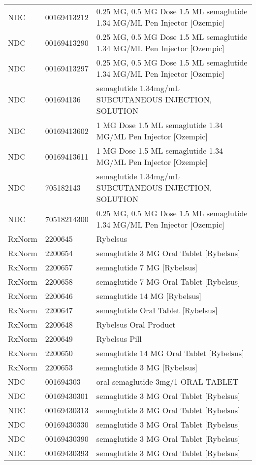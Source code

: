 \begin{longtable}{p{}p{}p{}}
  NDC & 00169413212 & 0.25 MG, 0.5 MG Dose 1.5 ML semaglutide 1.34 MG/ML Pen Injector [Ozempic] \\ 
  NDC & 00169413290 & 0.25 MG, 0.5 MG Dose 1.5 ML semaglutide 1.34 MG/ML Pen Injector [Ozempic] \\ 
  NDC & 00169413297 & 0.25 MG, 0.5 MG Dose 1.5 ML semaglutide 1.34 MG/ML Pen Injector [Ozempic] \\ 
  NDC & 001694136 & semaglutide 1.34mg/mL SUBCUTANEOUS INJECTION, SOLUTION \\ 
  NDC & 00169413602 & 1 MG Dose 1.5 ML semaglutide 1.34 MG/ML Pen Injector [Ozempic] \\ 
  NDC & 00169413611 & 1 MG Dose 1.5 ML semaglutide 1.34 MG/ML Pen Injector [Ozempic] \\ 
  NDC & 705182143 & semaglutide 1.34mg/mL SUBCUTANEOUS INJECTION, SOLUTION \\ 
  NDC & 70518214300 & 0.25 MG, 0.5 MG Dose 1.5 ML semaglutide 1.34 MG/ML Pen Injector [Ozempic] \\ 
  RxNorm & 2200645 & Rybelsus \\ 
  RxNorm & 2200654 & semaglutide 3 MG Oral Tablet [Rybelsus] \\ 
  RxNorm & 2200657 & semaglutide 7 MG [Rybelsus] \\ 
  RxNorm & 2200658 & semaglutide 7 MG Oral Tablet [Rybelsus] \\ 
  RxNorm & 2200646 & semaglutide 14 MG [Rybelsus] \\ 
  RxNorm & 2200647 & semaglutide Oral Tablet [Rybelsus] \\ 
  RxNorm & 2200648 & Rybelsus Oral Product \\ 
  RxNorm & 2200649 & Rybelsus Pill \\ 
  RxNorm & 2200650 & semaglutide 14 MG Oral Tablet [Rybelsus] \\ 
  RxNorm & 2200653 & semaglutide 3 MG [Rybelsus] \\ 
  NDC & 001694303 & oral semaglutide 3mg/1 ORAL TABLET \\ 
  NDC & 00169430301 & semaglutide 3 MG Oral Tablet [Rybelsus] \\ 
  NDC & 00169430313 & semaglutide 3 MG Oral Tablet [Rybelsus] \\ 
  NDC & 00169430330 & semaglutide 3 MG Oral Tablet [Rybelsus] \\ 
  NDC & 00169430390 & semaglutide 3 MG Oral Tablet [Rybelsus] \\ 
  NDC & 00169430393 & semaglutide 3 MG Oral Tablet [Rybelsus] \\ 

\end{longtable}
